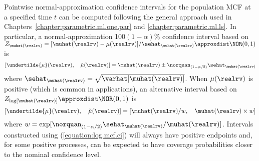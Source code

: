 Pointwise normal-approximation confidence intervals for the
population MCF at a specified time $t$ can be computed following the
general approach used in
Chapters~\ref{chapter:parametric.ml.one.par} and
\ref{chapter:parametric.ml.ls}. In particular, a 
normal-approximation 100$(1-\alpha)\%$ confidence interval based on
$Z_{\muhat(\realrv)} =
[\muhat(\realrv)-\mu(\realrv)]/\sehat_{\muhat(\realrv)}
\approxdist \NOR(0,1)$
is
\begin{equation} 
\label{equation:mcf.ci}
[\undertilde{\mu}(\realrv) , \quad \tilde{\mu}(\realrv)] =
\muhat(\realrv) \pm \norquan_{(1-\alpha/2)} \sehat_{\muhat(\realrv)}
\end{equation}
where $\sehat_{\muhat(\realrv)}= \sqrt{
\varhat[\muhat(\realrv)] }$. When $\mu(\realrv)$
is positive (which is common in applications), an alternative
interval based on $Z_{\log[\muhat(\realrv)]} \approxdist \NOR(0,1)$
is
\begin{equation} 
\label{equation:log.mcf.ci}
[\undertilde{\mu}(\realrv) , \quad
\tilde{\mu}(\realrv)] = [\muhat(\realrv)/w, \quad
\muhat(\realrv) \times w]
\end{equation}
where $w=\exp[\norquan_{(1-\alpha/2)}
\sehat_{\muhat(\realrv)}/\muhat(\realrv)]$.  Intervals constructed
using (\ref{equation:log.mcf.ci}) will always have positive
endpoints and, for some positive processes, can be expected to have
coverage probabilities closer to the nominal confidence level.

